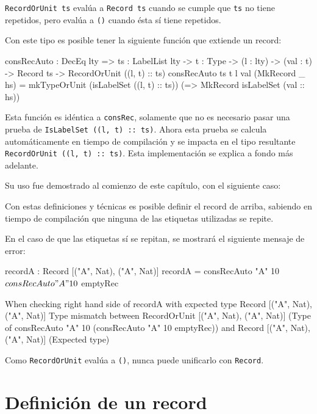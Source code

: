 \texttt{RecordOrUnit ts} evalúa a \texttt{Record ts} cuando se cumple que \texttt{ts} no tiene repetidos, pero evalúa a \texttt{()} cuando ésta sí tiene repetidos.

Con este tipo es posible tener la siguiente función que extiende un record:

\begin{code}
consRecAuto : DecEq lty => {ts : LabelList lty} ->
  {t : Type} -> (l : lty) -> (val : t) -> Record ts ->
  RecordOrUnit ((l, t) :: ts)
consRecAuto {ts} {t} l val (MkRecord _ hs) =
  mkTypeOrUnit (isLabelSet ((l, t) :: ts))
  (\isLabelSet => MkRecord isLabelSet (val :: hs))
\end{code}

Esta función es idéntica a \texttt{consRec}, solamente que no es necesario pasar una prueba de \texttt{IsLabelSet ((l, t) :: ts)}. Ahora esta prueba se calcula automáticamente en tiempo de compilación y se impacta en el tipo resultante \texttt{RecordOrUnit ((l, t) :: ts)}. Esta implementación se explica a fondo más adelante.

Su uso fue demostrado al comienzo de este capítulo, con el siguiente caso:


Con estas definiciones y técnicas es posible definir el record de arriba, sabiendo en tiempo de compilación que ninguna de las etiquetas utilizadas se repite.

En el caso de que las etiquetas sí se repitan, se mostrará el siguiente mensaje de error:

\begin{code}
recordA : Record [("A", Nat), ("A", Nat)]
recordA = consRecAuto "A" 10 $
  consRecAuto "A" 10 $
  emptyRec

When checking right hand side of recordA with expected type
    Record [("A", Nat), ("A", Nat)]
  Type mismatch between
    RecordOrUnit [("A", Nat), ("A", Nat)]
      (Type of consRecAuto "A" 10
        (consRecAuto "A" 10 emptyRec))
  and
    Record [("A", Nat), ("A", Nat)] (Expected type)
\end{code}

Como \texttt{RecordOrUnit} evalúa a \texttt{()}, nunca puede unificarlo con \texttt{Record}.

\section{Definición de un record}

